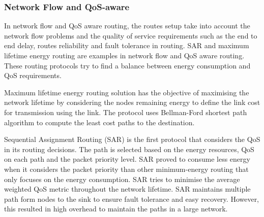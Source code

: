 
\subsubsection{Network Flow and QoS-aware}
In network flow and QoS aware routing, the routes setup take into account the network flow problems and the quality of service requirements such as the end to end delay, routes reliability and fault tolerance in routing. SAR \cite{sar} and maximum lifetime energy routing \cite{maxlifetimechang} are examples in network flow and QoS aware routing. These routing protocols try to find a balance between energy consumption and QoS requirements.


Maximum lifetime energy routing solution has the objective of maximising the network lifetime by considering the nodes remaining energy to define the link cost for transmission using the link. The protocol uses Bellman-Ford shortest path algorithm to compute the least cost paths to the destination. 


Sequential Assignment Routing (SAR) is the first protocol that considers the QoS in its routing decisions. The path is selected based on the energy resources, QoS on each path and the packet priority level. SAR proved to consume less energy when it considers the packet priority than other minimum-energy routing that only focuses on the energy consumption. SAR tries to minimise the average weighted QoS metric throughout the network lifetime. SAR maintains multiple path form nodes to the sink to ensure fault tolerance and easy recovery. However, this resulted in high overhead to maintain the paths in a large network. 

